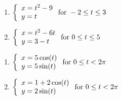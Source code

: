 \documentclass{ximera}
\begin{document}
\begin{multicols}{2}

\begin{enumerate}

\setcounter{enumi}{\value{HW}}

\item  ${\displaystyle \left\{ \begin{array}{l} x = t^2-9 \\ y = t  \end{array} \right. \vspace{.25in} \mbox{for } -2 \leq t \leq 3}$

\item  ${\displaystyle \left\{ \begin{array}{l} x = t^2-6t \\ y = 3-t  \end{array} \right. \vspace{.25in} \mbox{for } 0 \leq t \leq 5}$


\setcounter{HW}{\value{enumi}}

\end{enumerate}

\end{multicols}



\begin{multicols}{2}

\begin{enumerate}

\setcounter{enumi}{\value{HW}}
\item  ${\displaystyle \left\{ \begin{array}{l} x = 5\cos(t) \\ y = 5\sin(t)  \end{array} \right. \vspace{.25in} \mbox{for } 0 \leq t < 2\pi}$

\item  ${\displaystyle \left\{ \begin{array}{l} x = 1+2\cos(t) \\ y = 2\sin(t)  \end{array} \right. \vspace{.25in} \mbox{for } 0 \leq t < 2\pi}$


\setcounter{HW}{\value{enumi}}

\end{enumerate}

\end{multicols}
\end{document}
